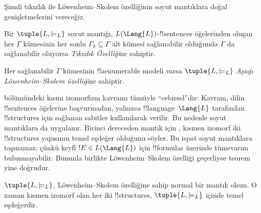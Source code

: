 \documentclass[../../../include/open-logic-section]{subfiles}
\begin{document}


Şimdi tıkızlık ile L\"owenheim--Skolem özelliğinin soyut mantıklara doğal
genişletmelerini vereceğiz.

\begin{defn}
Bir $\tuple{L,\models_L}$ soyut mantığı, $L(\Lang{L})$-!!{sentence}s
öğelerinden oluşan her $\Gamma$ kümesinin her sonlu
$\Gamma_0\subseteq\Gamma$ alt kümesi sağlanabilir olduğunda $\Gamma$ da
sağlanabilir oluyorsa \emph{Tıkızlık Özelliği}ne sahiptir.
\end{defn}

\begin{defn}
Her sağlanabilir $\Gamma$ kümesinin !!a{enumerable} modeli varsa
$\tuple{L,\models_L}$ \emph{Aşağı L\"owenheim--Skolem özelliği}ne sahiptir.
\end{defn}

 bölümündeki kısmi izomorfizm kavramı
tümüyle ``cebirsel''dir: Kavram, dilin !!{sentence}s öğelerine başvurmadan,
yalnızca !!{language}~$\Lang{L}$ tarafından !!{structure}s için sağlanan
sabitler kullanılarak verilir. Bu nedenle soyut mantıklara da
uygulanır. Birinci dereceden mantık için
, kısmen izomorf iki !!{structure}s yapısının
temel eşdeğer olduğunu söyler. Bu ispat soyut mantıklara taşınamaz; çünkü
keyfî $!E\in L(\Lang{L})$ için !!{formula}s üzerinde tümevarım bulunmayabilir.
Bununla birlikte L\"owenheim--Skolem özelliği geçerliyse teorem yine doğrudur.

\begin{thm}
$\tuple{L,\models_L}$, L\"owenheim--Skolem özelliğine sahip normal bir
mantık olsun. O zaman kısmen izomorf olan her iki !!{structure}s,
$\tuple{L,\models_L}$ içinde temel eşdeğerdir.
\end{thm}
\end{document}
